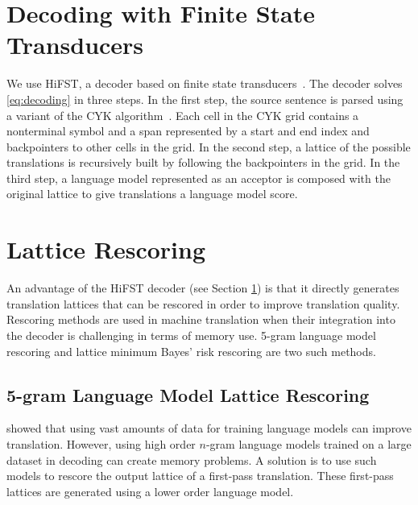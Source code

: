 
\section{Decoding with Finite State Transducers}
\label{sec:hifst}
  
We use HiFST, a decoder based on finite state transducers~\citep{iglesias-degispert-banga-byrne:2009:NAACL}.
The decoder solves \autoref{eq:decoding} in three steps. In the first step, the source
sentence is parsed using a variant of the CYK algorithm~\citep{chappelier-rahman:1998:TAPD}. Each cell in the CYK
grid contains a nonterminal symbol and a span represented by a start and
end index and backpointers to other cells in the grid. In the second step, a lattice of the possible translations 
is recursively built by following the backpointers in the grid.
In the third step, a language model represented as an acceptor is composed
with the original lattice to give translations a language model score.

\section{Lattice Rescoring}
\label{sec:rescoring}

An advantage of the HiFST decoder (see Section \ref{sec:hifst}) is that it directly %
generates translation lattices that can be rescored in order to improve translation quality.
Rescoring methods are used in machine translation when their integration into the decoder
is challenging in terms of memory use. 5-gram language model rescoring and lattice minimum
Bayes' risk rescoring are two such methods.

\subsection{5-gram Language Model Lattice Rescoring}

\citet{brants-popat-xu-och-dean:2007:EMNLP-CoNLL} showed that using vast
amounts of data for training language models can improve translation. However,
using high order $n$-gram language models trained on
a large dataset in decoding can create memory problems. %
A solution is to use such models to rescore the output
lattice of a first-pass translation. These first-pass lattices are generated
using a lower
order language model.

